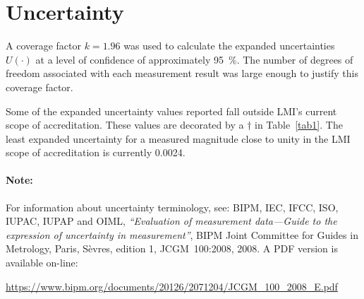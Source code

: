 \documentclass[11pt,a4paper]{article}
\newcommand{\referenceGUM}{
For information about uncertainty terminology, see: 
BIPM, IEC, IFCC, ISO, IUPAC, IUPAP and OIML, 
\textit{``Evaluation of measurement data---Guide to the expression of uncertainty in measurement''}, 
BIPM Joint Committee for Guides in Metrology, Paris, S\`evres, edition 1, JCGM~100:2008, 2008. 
A PDF version is available on-line:

\begin{center}
	\href{%
		https://www.bipm.org/documents/20126/2071204/JCGM_100_2008_E.pdf
	}{%
		https://www.bipm.org/documents/20126/2071204/JCGM\_100\_2008\_E.pdf
	}
\end{center}
}
\begin{document}
\section{Uncertainty}
A coverage factor $k=1.96$ was used to calculate the expanded uncertainties $U(\cdot)$ at a level of confidence of approximately \SI{95}{\percent}. 
The number of degrees of freedom associated with each measurement result was large enough to justify this coverage factor.  

Some of the expanded uncertainty values reported fall outside LMI's current scope of accreditation. 
These values are decorated by a $\dagger$ in Table~\ref{tab1}. 
The least expanded uncertainty for a measured magnitude close to unity in the LMI scope of accreditation is currently 0.0024. 

\paragraph{Note:} \referenceGUM	

\end{document}
